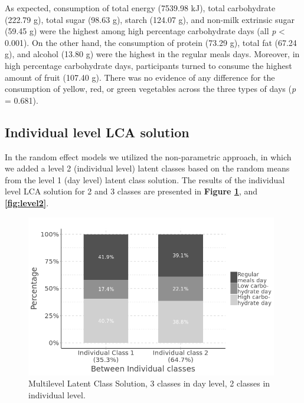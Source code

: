 As expected, consumption of total energy (7539.98 kJ), total carbohydrate (222.79 g), total sugar (98.63 g), starch (124.07 g), and non-milk extrinsic sugar (59.45 g) were the highest among high percentage carbohydrate days (all \textit{p} < 0.001). On the other hand, the consumption of protein (73.29 g), total fat (67.24 g), and alcohol (13.80 g) were the highest in the regular meals days. Moreover, in high percentage carbohydrate days, participants turned to consume the highest amount of fruit (107.40 g). There was no evidence of any difference for the consumption of yellow, red, or green vegetables across the three types of days (\textit{p} = 0.681).\vspace{-0.6cm}


\subsection{Individual level LCA solution}\vspace{-0.3cm}

In the random effect models we utilized the non-parametric approach, in which we added a level 2 (individual level) latent classes based on the random means from the level 1 (day level) latent class solution. The results of the individual level LCA solution for 2 and 3 classes are presented in \textbf{Figure \ref{fig:CB2level2}}, and \textbf{\ref{fig:level2}}. 


\begin{figure}[H]
	\centering
	\includegraphics[width=11cm]{Figures/CB2level2.png}
	\decoRule
	\caption[Multilevel Latent Class Solution ($3\times2$).]{Multilevel Latent Class Solution, 3 classes in day level, 2 classes in individual level.}
	\label{fig:CB2level2}
\end{figure}

